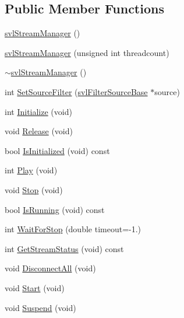 \subsection*{Public Member Functions}
\begin{DoxyCompactItemize}
\item 
\hyperlink{classsvl_stream_manager_a68ff7a941266f0906331aa3afccb778c}{svl\-Stream\-Manager} ()
\item 
\hyperlink{classsvl_stream_manager_a5d1b8134aa11537f167b51fc37d04b6d}{svl\-Stream\-Manager} (unsigned int threadcount)
\item 
\hyperlink{classsvl_stream_manager_a6bcc10c3012b0dd0d8a0fdb6c28cc46d}{$\sim$svl\-Stream\-Manager} ()
\item 
int \hyperlink{classsvl_stream_manager_aedd7f5b0f3f9542bf9d36b5b4848bffd}{Set\-Source\-Filter} (\hyperlink{classsvl_filter_source_base}{svl\-Filter\-Source\-Base} $\ast$source)
\item 
int \hyperlink{classsvl_stream_manager_a63d7780527caa9d39ab02a87cf736025}{Initialize} (void)
\item 
void \hyperlink{classsvl_stream_manager_a965dd0cc4055c77af739aa4c590a4e3f}{Release} (void)
\item 
bool \hyperlink{classsvl_stream_manager_aee755c1e0a31caf0390ab556919ced91}{Is\-Initialized} (void) const 
\item 
int \hyperlink{classsvl_stream_manager_a45adcd750e21702136ee31a990961fa8}{Play} (void)
\item 
void \hyperlink{classsvl_stream_manager_a291907660704e8c6baf1364933a1b09a}{Stop} (void)
\item 
bool \hyperlink{classsvl_stream_manager_a18b7bab00b796854ef65bc250217a4c4}{Is\-Running} (void) const 
\item 
int \hyperlink{classsvl_stream_manager_a974d869b5b117d7ea87f7e4fa59c5a5c}{Wait\-For\-Stop} (double timeout=-\/1.)
\item 
int \hyperlink{classsvl_stream_manager_a2fa049bd09f47b1d1449be7998e279ab}{Get\-Stream\-Status} (void) const 
\item 
void \hyperlink{classsvl_stream_manager_aedf2a8db4ac9fe6e87be13f9f99fe14d}{Disconnect\-All} (void)
\item 
void \hyperlink{classsvl_stream_manager_ad058664024ee544c2cd79338dc5592b7}{Start} (void)
\item 
void \hyperlink{classsvl_stream_manager_a5cc3d23d1cb765fed83376908ec5a30a}{Suspend} (void)
\end{DoxyCompactItemize}
